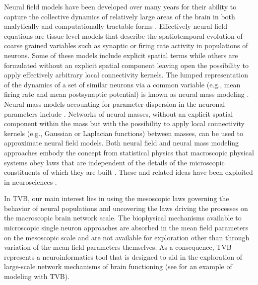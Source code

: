\documentclass{bioinfo}
\begin{document}
    Neural field models have been developed over many years for their ability to
    capture the collective dynamics of relatively large areas of the brain in both
    analytically and computationally tractable forms \citep{Beurle_1956,
    Wilson_1972, Wilson_1973, Nunez_1974, Amari_1975, Amari_1977, Wright_1995,
    Jirsa_1996, Jirsa_1997, Robinson_1997, Jirsa_2002, Attay_2006, Bojak_2010}.
    Effectively neural field equations are tissue level models that describe the
    spatiotemporal evolution of coarse grained variables such as synaptic or firing
    rate activity in populations of neurons. Some of these models include explicit
    spatial terms while others are formulated without an explicit spatial component
    leaving open the possibility to apply effectively arbitrary local connectivity
    kernels. The lumped representation of the dynamics of a set of similar neurons
    via a common variable (e.g., mean firing rate and mean postsynaptic potential)
    is known as neural mass modeling \citep{Freeman_1975book, Freeman_1992,
    LopesdaSilva_1974}. Neural mass models accounting for parameter dispersion in
    the neuronal parameters include \citep{Assisi_2005, Stefanescu_2008,
    Stefanescu_2011, Jirsa_2010}.  Networks of neural masses, without an explicit
    spatial component within the mass but with the possibility to apply local
    connectivity kernels (e.g., Gaussian or Laplacian functions) between masses, can
    be used to approximate neural field models. Both neural field and neural mass
    modeling approaches embody the concept from statistical physics that macroscopic
    physical systems obey laws that are independent of the details of the
    microscopic constituents of which they are built \citep{book_Haken_1983}.  These
    and related ideas have been exploited in neurosciences \citep{Kelso_1995,
    Buzsaky_2006}.
        
    In TVB, our main interest lies in using the mesoscopic laws governing the
    behavior of neural populations and uncovering the laws driving the processes
    on the macroscopic brain network scale. The biophysical mechanisms
    available to microscopic single neuron approaches are absorbed in the mean
    field parameters on the mesoscopic scale and are not available for
    exploration other than through variation of the mean field parameters
    themselves. As a consequence, TVB represents a neuroinformatics tool that
    is designed to aid in the exploration of large-scale network mechanisms of
    brain functioning (see \citet{Ritter_2013} for an example of modeling with TVB). 
\end{document}
